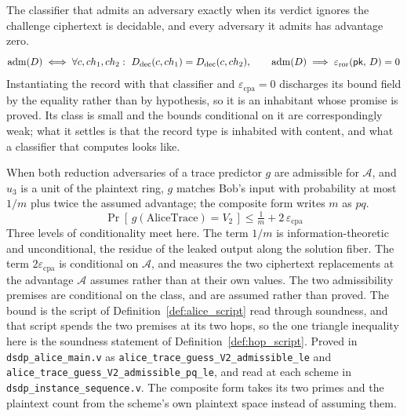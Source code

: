 \begin{definition}
  \label{def:cipher_constant_assumption}
  \rocqok
  The classifier that admits an adversary exactly when its verdict ignores the
  challenge ciphertext is decidable, and every adversary it admits has
  advantage zero.
  \[ \mathrm{adm}(D) \iff \forall c, ch_1, ch_2:\
       D_{\mathrm{dec}}(c, ch_1) = D_{\mathrm{dec}}(c, ch_2),
     \qquad \mathrm{adm}(D) \implies \varepsilon_{\mathrm{ror}}(\mathsf{pk},\,D) = 0 \]
  Instantiating the record with that classifier and
  $\varepsilon_{\mathrm{cpa}} = 0$
  discharges its bound field by the equality rather than by hypothesis, so it
  is an inhabitant whose promise is proved. Its class is small and the bounds
  conditional on it are correspondingly weak; what it settles is that the record type
  is inhabited with content, and what a classifier that computes looks like.
\end{definition}

\begin{theorem}
  \label{thm:alice_guess_admissible}
  \rocqok
  When both reduction adversaries of a trace predictor $g$ are admissible for
  $\mathcal{A}$, and $u_3$ is a unit of the plaintext ring, $g$ matches Bob's
  input with probability at most $1/m$ plus twice the assumed advantage; the
  composite form writes $m$ as $pq$.
  \[ \Pr[\,g(\mathrm{AliceTrace}) = V_2\,]
       \le \tfrac{1}{m} + 2\,\varepsilon_{\mathrm{cpa}} \]
  Three levels of conditionality meet here. The term $1/m$ is
  information-theoretic and
  unconditional, the residue of the leaked output along the solution fiber. The
  term $2\varepsilon_{\mathrm{cpa}}$ is conditional on $\mathcal{A}$, and
  measures the two ciphertext replacements at the advantage $\mathcal{A}$
  assumes rather than at their own values. The two admissibility premises are conditional on
  the class, and are assumed rather than proved.
  The bound is the script of Definition~\ref{def:alice_script} read through
  soundness, and that script spends the two premises at its two hops, so the
  one triangle inequality here is the soundness statement of
  Definition~\ref{def:hop_script}.
  Proved in \texttt{dsdp\_alice\_main.v} as
  \texttt{alice\_trace\_guess\_V2\_admissible\_le} and
  \texttt{alice\_trace\_guess\_V2\_admissible\_pq\_le}, and read at each
  scheme in \texttt{dsdp\_instance\_sequence.v}. The composite form takes its
  two primes and the plaintext count from the scheme's own plaintext space
  instead of assuming them.
\end{theorem}

